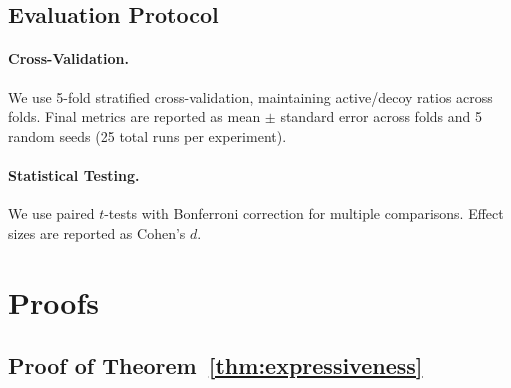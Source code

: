 \documentclass[sigconf]{acmart}
\begin{document}
\subsection{Evaluation Protocol}

\paragraph{Cross-Validation.} We use 5-fold stratified cross-validation, maintaining active/decoy ratios across folds. Final metrics are reported as mean $\pm$ standard error across folds and 5 random seeds (25 total runs per experiment).

\paragraph{Statistical Testing.} We use paired $t$-tests with Bonferroni correction for multiple comparisons. Effect sizes are reported as Cohen's $d$.

\section{Proofs}
\label{app:proofs}

\subsection{Proof of Theorem~\ref{thm:expressiveness}}
\end{document}
